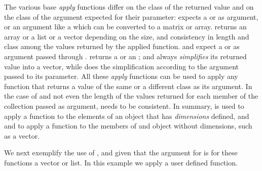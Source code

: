 \documentclass[krantz2]{krantz}\usepackage{knitr}%
\begin{document}
The various base \Rlang \emph{apply} functions differ on the class of the returned value and on the class of the argument expected for their  parameter:  expects a  or  as argument, or an argument like a  which can be converted to a matrix or array.  returns an array or a list or a vector depending on the size, and consistency in length and class among the values returned by the applied function.  and  expect a  or  as argument passed through .  returns a  or an ; and  always \emph{simplifies} its returned value into a vector, while  does the simplification according to the argument passed to its  parameter. All these \emph{apply} functions can be used to apply any \Rlang function that returns a value of the same or a different class as its argument. In the case of  and  not even the length of the values returned for each member of the collection passed as argument, needs to be consistent. In summary,  is used to apply a function to the elements of an object that has \emph{dimensions} defined, and  and  to apply a function to the members of and object without dimensions, such as a vector.

We next exemplify the use of ,  and  given that the argument for  is for these functions a vector or list. In this example we apply a user defined function.
\end{document}
